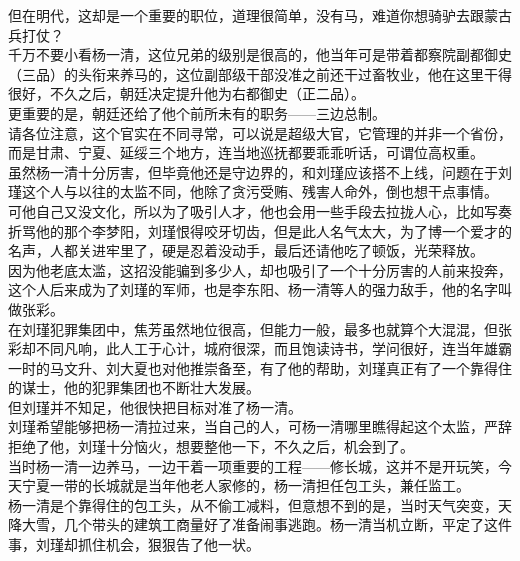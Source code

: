 \begin{multicols}{\theparacolNo}
但在明代，这却是一个重要的职位，道理很简单，没有马，难道你想骑驴去跟蒙古兵打仗？\\

千万不要小看杨一清，这位兄弟的级别是很高的，他当年可是带着都察院副都御史（三品）的头衔来养马的，这位副部级干部没准之前还干过畜牧业，他在这里干得很好，不久之后，朝廷决定提升他为右都御史（正二品）。\\

更重要的是，朝廷还给了他个前所未有的职务——三边总制。\\

请各位注意，这个官实在不同寻常，可以说是超级大官，它管理的并非一个省份，而是甘肃、宁夏、延绥三个地方，连当地巡抚都要乖乖听话，可谓位高权重。\\

虽然杨一清十分厉害，但毕竟他还是守边界的，和刘瑾应该搭不上线，问题在于刘瑾这个人与以往的太监不同，他除了贪污受贿、残害人命外，倒也想干点事情。\\

可他自己又没文化，所以为了吸引人才，他也会用一些手段去拉拢人心，比如写奏折骂他的那个李梦阳，刘瑾恨得咬牙切齿，但是此人名气太大，为了博一个爱才的名声，人都关进牢里了，硬是忍着没动手，最后还请他吃了顿饭，光荣释放。\\

因为他老底太滥，这招没能骗到多少人，却也吸引了一个十分厉害的人前来投奔，这个人后来成为了刘瑾的军师，也是李东阳、杨一清等人的强力敌手，他的名字叫做张彩。\\

在刘瑾犯罪集团中，焦芳虽然地位很高，但能力一般，最多也就算个大混混，但张彩却不同凡响，此人工于心计，城府很深，而且饱读诗书，学问很好，连当年雄霸一时的马文升、刘大夏也对他推崇备至，有了他的帮助，刘瑾真正有了一个靠得住的谋士，他的犯罪集团也不断壮大发展。\\

但刘瑾并不知足，他很快把目标对准了杨一清。\\

刘瑾希望能够把杨一清拉过来，当自己的人，可杨一清哪里瞧得起这个太监，严辞拒绝了他，刘瑾十分恼火，想要整他一下，不久之后，机会到了。\\

当时杨一清一边养马，一边干着一项重要的工程——修长城，这并不是开玩笑，今天宁夏一带的长城就是当年他老人家修的，杨一清担任包工头，兼任监工。\\

杨一清是个靠得住的包工头，从不偷工减料，但意想不到的是，当时天气突变，天降大雪，几个带头的建筑工商量好了准备闹事逃跑。杨一清当机立断，平定了这件事，刘瑾却抓住机会，狠狠告了他一状。\\


\end{multicols}
